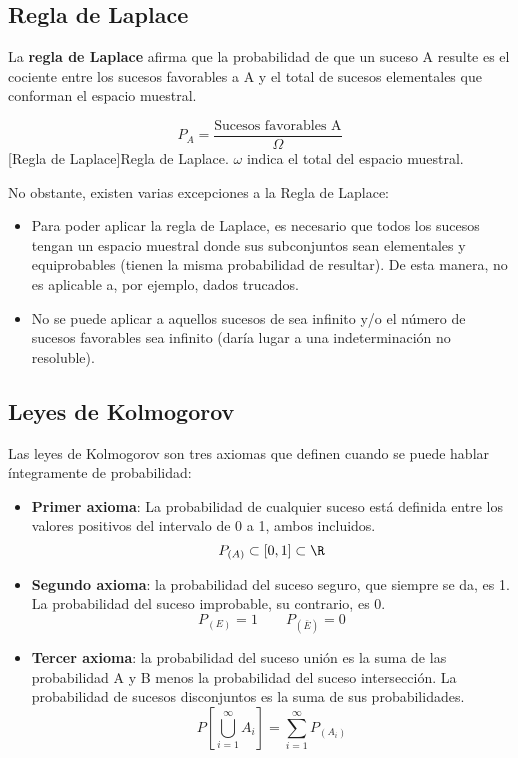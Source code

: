 \subsection{Regla de Laplace}
La \textbf{regla de Laplace} afirma que la probabilidad de que un suceso A resulte es el cociente entre los sucesos favorables a A y el total de sucesos elementales que conforman el espacio muestral.
\begin{center}
    \begin{equation}
        P_A = \dfrac{\mbox{Sucesos favorables A}}{\Omega}
    \end{equation}
    [Regla de Laplace]{Regla de Laplace. $\omega$ indica el total del espacio muestral.}
\end{center}
No obstante, existen varias excepciones a la Regla de Laplace:
\begin{itemize}[itemsep=0pt,parsep=0pt,topsep=0pt,partopsep=0pt]
    \item Para poder aplicar la regla de Laplace, es necesario que todos los sucesos tengan un espacio muestral donde sus subconjuntos sean elementales y equiprobables (tienen la misma probabilidad de resultar). De esta manera, no es aplicable a, por ejemplo, dados trucados.
    \item No se puede aplicar a aquellos sucesos de sea infinito y/o el número de sucesos favorables sea infinito (daría lugar a una indeterminación no resoluble).
\end{itemize}
\subsection{Leyes de Kolmogorov}
Las leyes de Kolmogorov son tres axiomas que definen cuando se puede hablar íntegramente de probabilidad:
\begin{itemize}[itemsep=0pt,parsep=0pt,topsep=0pt,partopsep=0pt]
    \item \textbf{Primer axioma}: La probabilidad de cualquier suceso está definida entre los valores positivos del intervalo de 0 a 1, ambos incluidos.
        \[ P_{\left( A\right) }  \subset \left[ 0,1 \right] \subset \R \]
    \item\textbf{Segundo axioma}: la probabilidad del suceso seguro, que siempre se da, es 1. La probabilidad del suceso improbable, su contrario, es 0.
        \[ P_{\left( E \right) } = 1 \qquad P_{\left( \bar{E} \right) } = 0 \]
    \item\textbf{Tercer axioma}: la probabilidad del suceso unión es la suma de las probabilidad A y B menos la probabilidad del suceso intersección. La probabilidad de sucesos disconjuntos es la suma de sus probabilidades.
        \[ P\left[ \bigcup_{i = 1}^{\infty} A_i\right] = \sum_{i = 1}^{\infty} P_{\left( A_i\right) }  \]
\end{itemize}
